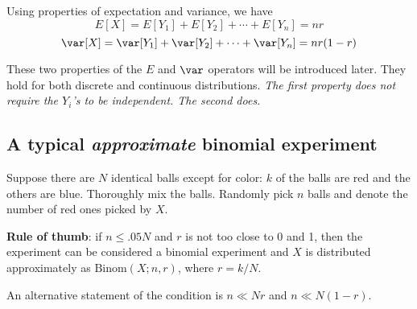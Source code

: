 \documentclass[12pt]{article}
\begin{document}
Using properties of expectation and variance, we have
\[
E[X] = E[Y_1] + E[Y_2] + \dotsb + E[Y_n] = nr
\]
\[
\var[X] = \var[Y_1] + \var[Y_2] + \dotsb + \var[Y_n] = nr(1-r)
\]

These two properties of the $E$ and $\var$ operators will be introduced
later. They hold for both discrete and continuous distributions.
\emph{The first property does not require the $Y_i$'s to be independent.
The second does.}

\subsection{A typical \emph{approximate} binomial experiment}

Suppose there are $N$ identical balls except for color:
$k$ of the balls are red and the others are blue.
Thoroughly mix the balls.
Randomly pick $n$ balls and denote the number of red ones picked by $X$.

\textbf{Rule of thumb}:
if $n \le .05 N$ and $r$ is not too close to 0 and 1,
then the experiment
can be considered a binomial experiment and $X$ is distributed
approximately as $\text{Binom}(X; n, r)$, where $r = k/N$.

An alternative statement of the condition is
$n \ll Nr$ and $n \ll N(1-r)$.

% 
\end{document}
